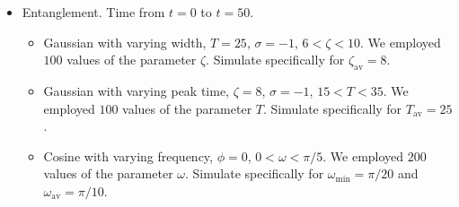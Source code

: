 \documentclass{article}
\begin{document}
\begin{itemize}
\begin{itemize}
          Simulate specifically for $\omega_{\text{min}}=\pi/20$ and $\omega_{\text{av}}=\pi/10$.
    \end{itemize}
    \item Entanglement. Time from $t=0$ to $t=50$.
    \begin{itemize}
        \item Gaussian with varying width, $T=25$, $\sigma=-1$, $6<\zeta<10$. We employed $100$ values of the parameter $\zeta$.
         Simulate specifically for $\zeta_{\text{av}}=8$.
        \item Gaussian with varying peak time, $\zeta=8$, $\sigma=-1$, $15<T<35$. We employed $100$ values of the parameter $T$.
        Simulate specifically for $T_{\text{av}}=25$.
        \item Cosine with varying frequency, $\phi=0$, $0<\omega<\pi/5$. We employed $200$ values of the parameter $\omega$.
         Simulate specifically for $\omega_{\text{min}}=\pi/20$ and $\omega_{\text{av}}=\pi/10$.
    \end{itemize}
\end{itemize}



\printbibliography
\end{document}
